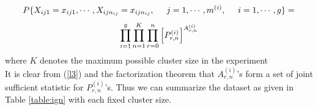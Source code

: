 \documentclass[12pt,oneside]{report}
\theoremstyle{definition}
\theoremstyle{mystyle}
\begin{document}
 \begin{equation*}
 P\{X_{ij1}=x_{ij1},\cdots,X_{ijn_{ij}}=x_{ijn_{ij}}, \hspace{5mm} j=1,\cdots,m^{(i)},\hspace{5mm} i=1,\cdots,g\}=
 \end{equation*}
\begin{equation}\label{l3}
\prod \limits_{i=1}^{g}\prod \limits_{n=1}^{K}\prod \limits_{r=0}^{n} \left[  \LARGE {P_{r,n}^{(i)}}\right]^{A_{r,n}^{(i)}}
\end{equation}
where $K$ denotes the maximum possible cluster size in the experiment  \\
It is clear from  (\ref{l3}) and the factorization theorem that  $A_{r,n}^{(i)}$'s form a set of joint sufficient statistic for $P_{r,n}^{(i)}$'s. Thus we can summarize the dataset as given in Table \ref{table:ign} with each fixed cluster size.\\
\end{document}
